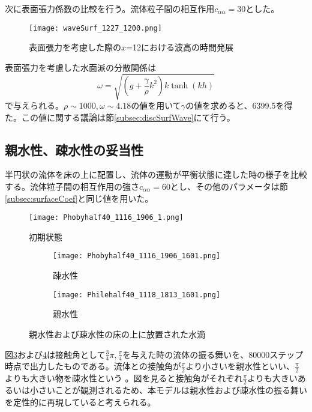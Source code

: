 \documentclass[]{jsarticle}
\begin{document}
次に表面張力係数の比較を行う。流体粒子間の相互作用$c_{\alpha\alpha}=30$とした。
\begin{figure}[H]
  \centering
  \texttt{[image: waveSurf\_1227\_1200.png]}
  \caption{表面張力を考慮した際の$x$=12における波高の時間発展}
  \label{fig:waveSurfEvolwithSurfTension}
\end{figure}

表面張力を考慮した水面派の分散関係は
\begin{equation}
\omega=\sqrt{\left(g+\frac{\gamma}{\rho}k^2 \right)k \tanh (kh)}
\end{equation}
で与えられる\cite{tatsumiKiso}。$\rho\sim1000, \omega\sim4.18$の値を用いて$\gamma$の値を求めると、6399.5を得た。この値に関する議論は節\ref{subsec:discSurfWave}にて行う。


\subsection{親水性、疎水性の妥当性}
\label{subsec:validity}

半円状の流体を床の上に配置し、流体の運動が平衡状態に達した時の様子を比較する。流体粒子間の相互作用の強さ$c_{\alpha\alpha}=60$とし、その他のパラメータは節\ref{subsec:surfaceCoef}と同じ値を用いた。
\begin{figure}[H]
  \centering
  \texttt{[image: Phobyhalf40\_1116\_1906\_1.png]}
  \caption{初期状態}
  \label{fig:contactInitial}
\end{figure}

\begin{figure}[H]
  \centering
  \begin{subfigure}{0.8\columnwidth}
    \centering
    \texttt{[image: Phobyhalf40\_1116\_1906\_1601.png]}
    \caption{疎水性}
    \label{fig:PhobyDrop}
  \end{subfigure}
  \begin{subfigure}{0.8\columnwidth}
    \centering
    \texttt{[image: Philehalf40\_1118\_1813\_1601.png]}
    \caption{親水性}
    \label{fig:PhileDrop}
  \end{subfigure}
  \caption{親水性および疎水性の床の上に放置された水滴}
  \label{fig:contactAngles}
\end{figure}

図\ref{fig:PhobyDrop}および\ref{fig:PhileDrop}は接触角として$\frac{3}{4}\pi, \frac{\pi}{4}$を与えた時の流体の振る舞いを、80000ステップ時点で出力したものである。流体との接触角が$\frac{\pi}{2}$より小さいを親水性といい、$\frac{\pi}{2}$よりも大きい物を疎水性という \cite{Law2014}。図を見ると接触角がそれぞれ$\frac{\pi}{2}$よりも大きいあるいは小さいことが観測されるため、本モデルは親水性および疎水性の振る舞いを定性的に再現していると考えられる。
\end{document}
